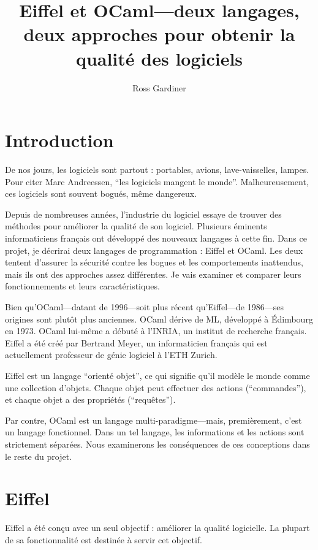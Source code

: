 \documentclass[french]{report}
\title{Eiffel et OCaml---deux langages, deux approches pour obtenir la qualité des logiciels}
\author{Ross Gardiner}
\begin{document}
\maketitle

\tableofcontents

\chapter{Introduction}

De nos jours, les logiciels sont partout : portables, avions, lave-vaisselles, lampes. Pour citer Marc Andreessen, \enquote{les logiciels mangent le monde}. Malheureusement, ces logiciels sont souvent bogués, m\^{e}me dangereux.

Depuis de nombreuses années, l’industrie du logiciel essaye de trouver des méthodes pour améliorer la qualité de son logiciel. Plusieurs éminents informaticiens français ont développé des nouveaux langages à cette fin. Dans ce projet, je décrirai deux langages de programmation : Eiffel et OCaml. Les deux tentent d’assurer la sécurité contre les bogues et les comportements inattendus, mais ils ont des approches assez différentes. Je vais examiner et comparer leurs fonctionnements et leurs caractéristiques.

Bien qu'OCaml---datant de 1996---soit plus récent qu'Eiffel---de 1986---ses origines sont plutôt plus anciennes.  OCaml dérive de ML, développé à Édimbourg en 1973. OCaml lui-m\^{e}me a débuté à l’INRIA, un institut de recherche français. Eiffel a été créé par Bertrand Meyer, un informaticien français qui est actuellement professeur de génie logiciel à l’ETH Zurich.

Eiffel est un langage \enquote{orienté objet}, ce qui signifie qu'il modèle le monde comme une collection d’objets. Chaque objet peut effectuer des actions (\enquote{commandes}), et chaque objet a des propriétés (\enquote{requêtes}).

Par contre, OCaml est un langage multi-paradigme---mais, premièrement, c’est un langage fonctionnel. Dans un tel langage, les informations et les actions sont strictement séparées. Nous examinerons les conséquences de ces conceptions dans le reste du projet.

\chapter{Eiffel}

Eiffel a été conçu avec un seul objectif : améliorer la qualité logicielle. La plupart de sa fonctionnalité est destinée à servir cet objectif.
 
\end{document}
